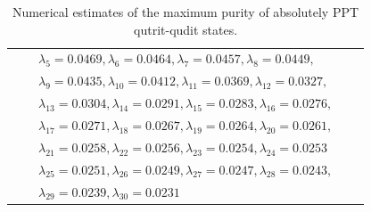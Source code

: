 \documentclass[reqno, 12pt,a4letter]{amsart}
\theoremstyle{definition}
\theoremstyle{plain}
\begin{document}
\begin{small}
\begin{table}
\begin{tabular}{|l|l|l|l|l|}
			&   &  $\lambda_5=0.0469, \lambda_6=0.0464, \lambda_7 =0.0457, \lambda_8=0.0449,$ \\
			
			&   &  $\lambda_9=0.0435, \lambda_{10}=0.0412, \lambda_{11} =0.0369, \lambda_{12}=0.0327,$ \\ 
			
			&   &  $\lambda_{13}=0.0304, \lambda_{14}=0.0291, \lambda_{15} =0.0283, \lambda_{16} = 0.0276,$ \\
			
			&   &  $\lambda_{17}=0.0271, \lambda_{18}=0.0267, \lambda_{19} =0.0264, \lambda_{20} = 0.0261,$ \\ 
			
			&   &  $\lambda_{21}=0.0258, \lambda_{22}=0.0256, \lambda_{23} =0.0254, \lambda_{24} = 0.0253$ \\ 
			
			&   &  $\lambda_{25}=0.0251, \lambda_{26}=0.0249, \lambda_{27} =0.0247, \lambda_{28}=0.0243,$ \\
			
			&   &  $\lambda_{29}=0.0239, \lambda_{30} =0.0231$ \\ \hline
			
		\end{tabular}
		\vskip0.5cm
		\caption{Numerical estimates of the maximum purity of  absolutely PPT qutrit-qudit states.}
	\end{table}
\end{small}
\end{document}
